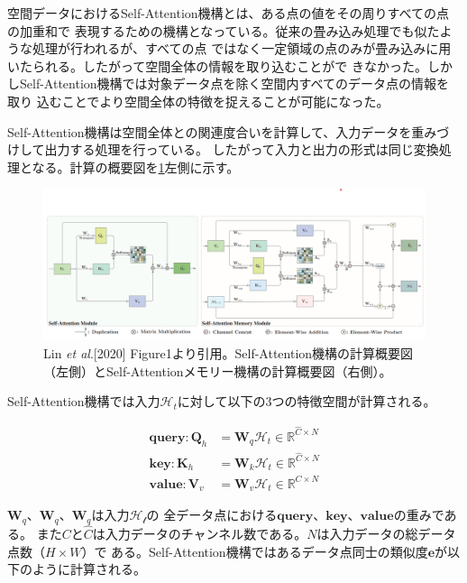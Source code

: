 空間データにおけるSelf-Attention機構とは、ある点の値をその周りすべての点の加重和で
表現するための機構となっている。従来の畳み込み処理でも似たような処理が行われるが、すべての点
ではなく一定領域の点のみが畳み込みに用いたられる。したがって空間全体の情報を取り込むことがで
きなかった。しかしSelf-Attention機構では対象データ点を除く空間内すべてのデータ点の情報を取り
込むことでより空間全体の特徴を捉えることが可能になった。

Self-Attention機構は空間全体との関連度合いを計算して、入力データを重みづけして出力する処理を行っている。
したがって入力と出力の形式は同じ変換処理となる。計算の概要図を\ref{fig:self-attention-memory-module}左側に示す。

\begin{figure}[H]
\begin{center}
\includegraphics[width=\linewidth]{fig/methodologies/self-attention-memory-module.png}
\captionsetup{width=0.9\linewidth}
\caption{Lin \textit{et al}.[2020] Figure1より引用。Self-Attention機構の計算概要図（左側）とSelf-Attentionメモリー機構の計算概要図（右側）。}
\label{fig:self-attention-memory-module}
\end{center}
\end{figure}

Self-Attention機構では入力$\mathcal{H}_{t}$に対して以下の3つの特徴空間が計算される。

\begin{align}
	\boldsymbol{query:} \boldsymbol{Q}_{h} &= \boldsymbol{W}_{q}\mathcal{H}_{t} \in \mathbb{R}^{\hat{C} \times N} \\
	\boldsymbol{key:} \boldsymbol{K}_{h} &= \boldsymbol{W}_{k}\mathcal{H}_{t} \in \mathbb{R}^{\hat{C} \times N} \\
	\boldsymbol{value:} \boldsymbol{V}_{v} &= \boldsymbol{W}_{v}\mathcal{H}_{t} \in \mathbb{R}^{C \times N}
\end{align}

$\boldsymbol{W}_{q}$、$\boldsymbol{W}_{q}$、$\boldsymbol{W}_{q}$は入力$\mathcal{{H}_{t}}$の
全データ点における$\boldsymbol{query}$、$\boldsymbol{key}$、$\boldsymbol{value}$の重みである。
また$C$と$\hat{C}$は入力データのチャンネル数である。$N$は入力データの総データ点数（$H \times W$）で
ある。Self-Attention機構ではあるデータ点同士の類似度$\boldsymbol{e}$が以下のように計算される。

